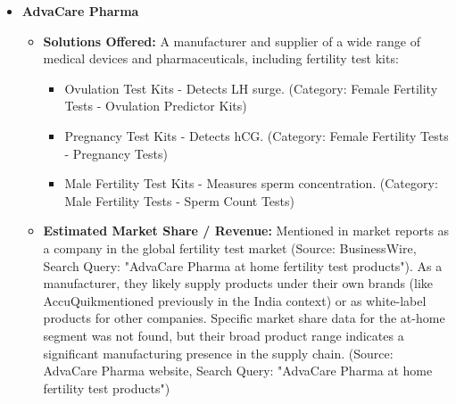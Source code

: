 \documentclass{article}
\begin{document}
\begin{itemize}[label=\textbullet]
    \item \textbf{AdvaCare Pharma}
    \begin{itemize}[label=--]
        \item \textbf{Solutions Offered:} A manufacturer and supplier of a wide range of medical devices and pharmaceuticals, including fertility test kits:
        \begin{itemize}[label=$\circ$]
            \item Ovulation Test Kits - Detects LH surge. (Category: Female Fertility Tests - Ovulation Predictor Kits)
            \item Pregnancy Test Kits - Detects hCG. (Category: Female Fertility Tests - Pregnancy Tests)
            \item Male Fertility Test Kits - Measures sperm concentration. (Category: Male Fertility Tests - Sperm Count Tests)
        \end{itemize}
        \item \textbf{Estimated Market Share / Revenue:} Mentioned in market reports as a company in the global fertility test market (Source: BusinessWire, Search Query: "AdvaCare Pharma at home fertility test products"). As a manufacturer, they likely supply products under their own brands (like AccuQuik\texttrademark mentioned previously in the India context) or as white-label products for other companies. Specific market share data for the at-home segment was not found, but their broad product range indicates a significant manufacturing presence in the supply chain. (Source: AdvaCare Pharma website, Search Query: "AdvaCare Pharma at home fertility test products")
    \end{itemize}
    \vspace{0.5em} %


\end{itemize}
\end{document}
